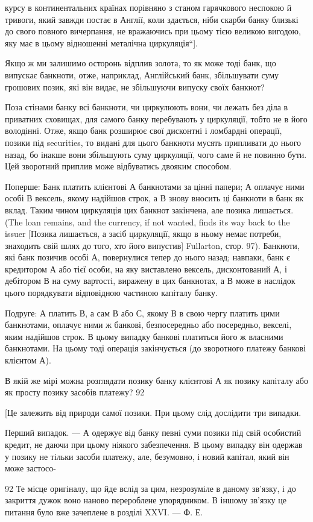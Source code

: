 курсу в континентальних країнах порівняно з станом гарячкового
неспокою й тривоги, який завжди постає в Англії, коли
здається, ніби скарби банку близькі до свого повного вичерпання,
не вражаючись при цьому тією великою вигодою, яку
має в цьому відношенні металічна циркуляція“].

Якщо ж ми залишимо осторонь відплив золота, то як може
тоді банк, що випускає банкноти, отже, наприклад, Англійський
банк, збільшувати суму грошових позик, які він видає, не збільшуючи
випуску своїх банкнот?

Поза стінами банку всі банкноти, чи циркулюють вони, чи
лежать без діла в приватних сховищах, для самого банку перебувають
у циркуляції, тобто не в його володінні. Отже, якщо
банк розширює свої дисконтні і ломбардні операції, позики під
securities, то видані для цього банкноти мусять припливати до
нього назад, бо інакше вони збільшують суму циркуляції, чого
саме й не повинно бути. Цей зворотний приплив може відбуватись
двояким способом.

Поперше: Банк платить клієнтові А банкнотами за цінні папери;
А оплачує ними особі В вексель, якому надійшов строк,
а В знову вносить ці банкноти в банк як вклад. Таким чином
циркуляція цих банкнот закінчена, але позика лишається. (The
loan remains, and the currency, if not wanted, finds its way back
to the issuer [Позика лишається, а засіб циркуляції, якщо в ньому
немає потреби, знаходить свій шлях до того, хто його випустив]
Fullarton, стор. 97). Банкноти, які банк позичив особі А, повернулися
тепер до нього назад; навпаки, банк є кредитором А
або тієї особи, на яку виставлено вексель, дисконтований А,
і дебітором В на суму вартості, виражену в цих банкнотах,
а В може в наслідок цього порядкувати відповідною частиною
капіталу банку.

Подруге: А платить В, а сам В або С, якому В в свою чергу
платить цими банкнотами, оплачує ними ж банкові, безпосередньо
або посередньо, векселі, яким надійшов строк. В цьому
випадку банкові платиться його ж власними банкнотами. На
цьому тоді операція закінчується (до зворотного платежу банкові
клієнтом А).

В якій же мірі можна розглядати позику банку клієнтові А
як позику капіталу або як просту позику засобів платежу? 92

[Це залежить від природи самої позики. При цьому слід
дослідити три випадки.

Перший випадок. — А одержує від банку певні суми позики під
свій особистий кредит, не даючи при цьому ніякого забезпечення.
В цьому випадку він одержав у позику не тільки засоби платежу,
але, безумовно, і новий капітал, який він може застосо-

92 Те місце оригіналу, що йде вслід за цим, незрозуміле в даному зв’язку,
і до закриття дужок воно наново перероблене упорядником. В іншому зв’язку
це питання було вже зачеплене в розділі XXVI. — Ф. Е.
